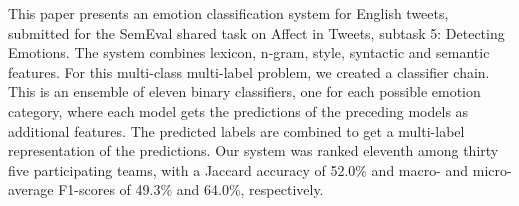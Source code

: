 This paper presents an emotion classification system for English tweets, submitted for the SemEval shared task on Affect in Tweets, subtask 5: Detecting Emotions. The system combines lexicon, n-gram, style, syntactic and semantic features. For this multi-class multi-label problem, we created a classifier chain. This is an ensemble of eleven binary classifiers, one for each possible emotion category, where each model gets the predictions of the preceding models as additional features. The predicted labels are combined to get a multi-label representation of the predictions. Our system was ranked eleventh among thirty five participating teams, with a Jaccard accuracy of 52.0\% and macro- and micro-average F1-scores of 49.3\% and 64.0\%, respectively.
